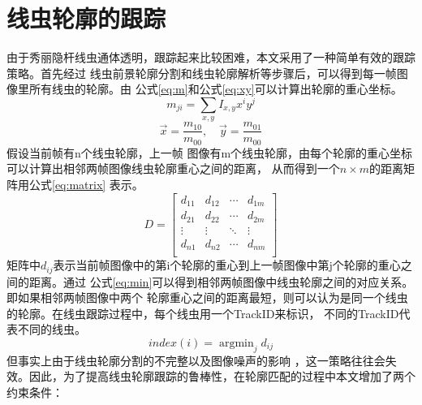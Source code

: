 \section{线虫轮廓的跟踪}
	由于秀丽隐杆线虫通体透明，跟踪起来比较困难，本文采用了一种简单有效的跟踪策略。首先经过
	线虫前景轮廓分割和线虫轮廓解析等步骤后，可以得到每一帧图像里所有线虫的轮廓。由
	公式\ref{eq:m}和公式\ref{eq:xy}可以计算出轮廓的重心坐标。
	\begin{equation}
		m_{ji}=\sum_{x,y}I_{x,y}x^iy^j \label{eq:m}
	\end{equation}
	\begin{equation}
		\vec{x}=\frac{m_{10}}{m_{00}},\quad \vec{y}=\frac{m_{01}}{m_{00}}\label{eq:xy}
	\end{equation}
	假设当前帧有n个线虫轮廓，上一帧
	图像有m个线虫轮廓，由每个轮廓的重心坐标可以计算出相邻两帧图像线虫轮廓重心之间的距离，
	从而得到一个$n\times m$的距离矩阵用公式\ref{eq:matrix}
	表示。
		\begin{equation}
                        D=\left[
                \begin{matrix}
                 d_{11}      & d_{12}      & \cdots & d_{1m}      \\
                 d_{21}      & d_{22}      & \cdots & d_{2m}      \\
                 \vdots & \vdots & \ddots & \vdots \\
                 d_{n1}      & d_{n2}      & \cdots & d_{nm}      \\
                \end{matrix}
                \right]\label{eq:matrix}
    \end{equation}
	矩阵中$d_{ij}$表示当前帧图像中的第i个轮廓的重心到上一帧图像中第j个轮廓的重心之间的距离。通过
	公式\ref{eq:min}可以得到相邻两帧图像中线虫轮廓之间的对应关系。即如果相邻两帧图像中两个
	轮廓重心之间的距离最短，则可以认为是同一个线虫的轮廓。在线虫跟踪过程中，每个线虫用一个TrackID来标识，
	不同的TrackID代表不同的线虫。
		\begin{equation}
        index(i)=\mathop{\arg\min}_{j} d_{ij}\label{eq:min}
		\end{equation}
	但事实上由于线虫轮廓分割的不完整以及图像噪声的影响
	，这一策略往往会失效。因此，为了提高线虫轮廓跟踪的鲁棒性，在轮廓匹配的过程中本文增加了两个约束条件：
